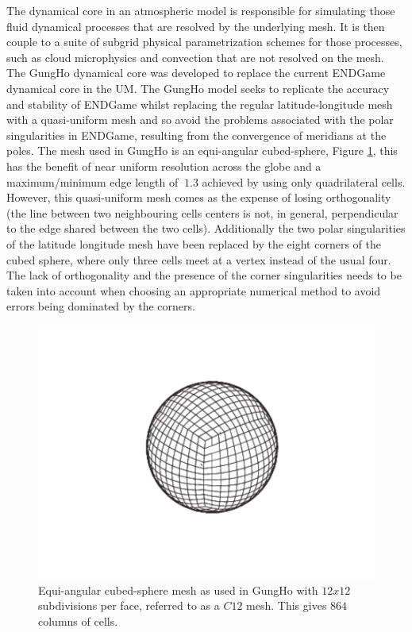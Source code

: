 \documentclass[times]{elsarticle}
\begin{document}
The dynamical core in an atmospheric model is responsible for simulating those 
fluid dynamical processes that are resolved by the underlying mesh. It is then 
couple to a suite of subgrid physical parametrization schemes for those processes, 
such as cloud microphysics and convection that are not resolved on the mesh.
The GungHo dynamical core was developed to replace the current ENDGame
dynamical core in the UM. The GungHo model seeks to replicate the 
accuracy and stability of ENDGame whilst replacing the regular latitude-longitude
mesh with a quasi-uniform mesh and so avoid the problems associated with
the polar singularities in ENDGame, resulting from the convergence of 
meridians at the poles. The mesh used in GungHo is an equi-angular
cubed-sphere, Figure \ref{fig:cubed-sphere}, this has the benefit of near
uniform resolution across the globe and a maximum/minimum edge length of $~1.3$ achieved by using only quadrilateral cells. 
However, this quasi-uniform mesh comes as the expense of losing orthogonality
(the line between two neighbouring cells centers is not, in general, 
perpendicular to the edge shared between the two cells). Additionally the 
two polar singularities of the latitude longitude mesh have been replaced 
by the eight corners of the cubed sphere, where only three cells meet at a
vertex instead of the usual four. The lack of orthogonality and the presence
of the corner singularities needs to be taken into account when choosing an 
appropriate numerical method to avoid errors being dominated by the corners.
%
\begin{figure}
\centering\includegraphics[width=0.8\linewidth]{Cubed-Sphere.pdf}
\caption{\label{fig:cubed-sphere} Equi-angular cubed-sphere mesh as
used in GungHo with $12x12$ subdivisions per face, 
referred to as a $C12$ mesh. This gives $864$ columns of cells. }
\end{figure}
%
\end{document}
